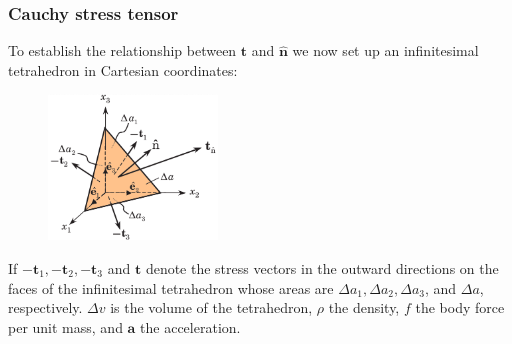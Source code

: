 \documentclass[notes]{beamer}
\begin{document}
\begin{frame}
	\frametitle{Cauchy stress tensor}
	To establish the relationship between $\mathbf{t}$ and $\mathbf{\hat{n}}$ we now set up an infinitesimal
	tetrahedron in Cartesian coordinates:
	\begin{figure}[ht]
		\centering
		\includegraphics[width=0.4\textwidth]{figs/stress-tetrahedron.png}
	\end{figure}
	If $\mathbf{-t}_1, \mathbf{-t}_2, \mathbf{-t}_3$ and $\mathbf{t}$ denote the stress vectors in the outward directions on the faces of the infinitesimal tetrahedron whose areas are $\Delta a_1, \Delta a_2, \Delta a_3$, and $\Delta a$, respectively. $\Delta v$ is the volume of the tetrahedron, $\rho$ the density, $f$ the body force per unit mass, and $\mathbf{a}$ the acceleration. 
\end{frame}
\end{document}
